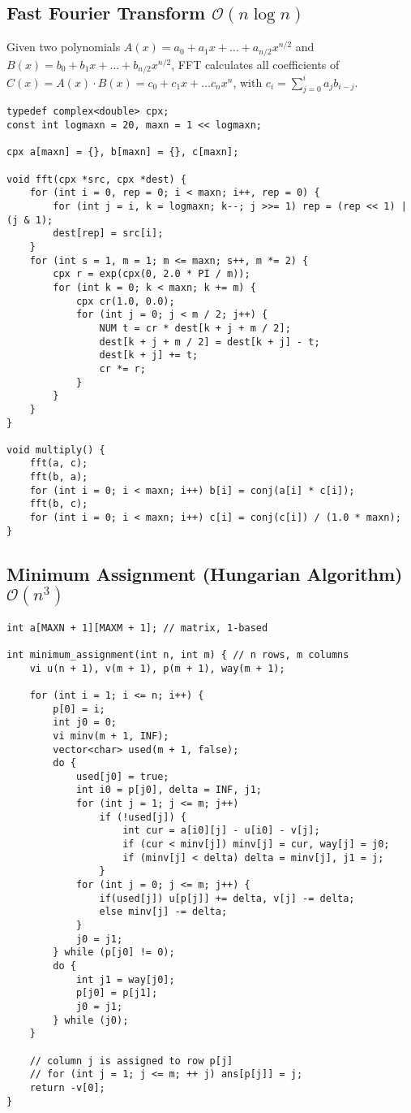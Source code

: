 \documentclass{article}
\begin{document}
\subsection{Fast Fourier Transform $\mathcal{O}(n \log n)$}

Given two polynomials $A(x) = a_0 + a_1 x + \dots + a_{n/2} x^{n/2}$ and $B(x) = b_0 + b_1 x + \dots + b_{n/2} x^{n/2}$, FFT calculates all coefficients of $C(x) = A(x) \cdot B(x) = c_0 + c_1 x + \dots c_{n} x^{n}$, with $c_i = \sum_{j=0}^{i} a_j b_{i-j}$.

\begin{lstlisting}
typedef complex<double> cpx;
const int logmaxn = 20, maxn = 1 << logmaxn;

cpx a[maxn] = {}, b[maxn] = {}, c[maxn];

void fft(cpx *src, cpx *dest) {
	for (int i = 0, rep = 0; i < maxn; i++, rep = 0) {
		for (int j = i, k = logmaxn; k--; j >>= 1) rep = (rep << 1) | (j & 1);
		dest[rep] = src[i];
	}
	for (int s = 1, m = 1; m <= maxn; s++, m *= 2) {
		cpx r = exp(cpx(0, 2.0 * PI / m));
		for (int k = 0; k < maxn; k += m) {
			cpx cr(1.0, 0.0);
			for (int j = 0; j < m / 2; j++) {
				NUM t = cr * dest[k + j + m / 2];
				dest[k + j + m / 2] = dest[k + j] - t;
				dest[k + j] += t;
				cr *= r;
			}
		}
	}
}

void multiply() {
	fft(a, c);
	fft(b, a);
	for (int i = 0; i < maxn; i++) b[i] = conj(a[i] * c[i]);
	fft(b, c);
	for (int i = 0; i < maxn; i++) c[i] = conj(c[i]) / (1.0 * maxn);
}
\end{lstlisting}

\subsection{Minimum Assignment (Hungarian Algorithm) $\mathcal{O}(n^{3})$}

\begin{lstlisting}
int a[MAXN + 1][MAXM + 1]; // matrix, 1-based

int minimum_assignment(int n, int m) { // n rows, m columns
	vi u(n + 1), v(m + 1), p(m + 1), way(m + 1);

	for (int i = 1; i <= n; i++) {
		p[0] = i;
		int j0 = 0;
		vi minv(m + 1, INF);
		vector<char> used(m + 1, false);
		do {
			used[j0] = true;
			int i0 = p[j0], delta = INF, j1;
			for (int j = 1; j <= m; j++)
				if (!used[j]) {
					int cur = a[i0][j] - u[i0] - v[j];
					if (cur < minv[j]) minv[j] = cur, way[j] = j0;
					if (minv[j] < delta) delta = minv[j], j1 = j;
				}
			for (int j = 0; j <= m; j++) {
				if(used[j]) u[p[j]] += delta, v[j] -= delta;
				else minv[j] -= delta;
			}
			j0 = j1;
		} while (p[j0] != 0);
		do {
			int j1 = way[j0];
			p[j0] = p[j1];
			j0 = j1;
		} while (j0);
	}

	// column j is assigned to row p[j]
	// for (int j = 1; j <= m; ++ j) ans[p[j]] = j;
	return -v[0];
}
\end{lstlisting}
\end{document}
